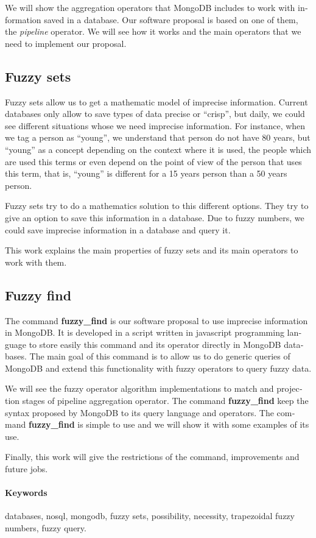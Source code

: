 \begin{otherlanguage}{american}
We will show the aggregation operators that MongoDB includes to work with information saved in a database. Our software proposal is based on one of them, the \textit{pipeline} operator. We will see how it works and the main operators that we need to implement our proposal.

\subsection{Fuzzy sets}

Fuzzy sets allow us to get a mathematic model of imprecise information. Current databases only allow to save types of data precise or ``crisp'', but daily, we could see different situations whose we need imprecise information. For instance, when we tag a person as ``young'', we understand that person do not have 80 years, but ``young'' as a concept depending on the context where it is used, the people which are used this terms or even depend on the point of view of the person that uses this term, that is, ``young'' is different for a 15 years person than a 50 years person.

Fuzzy sets try to do a mathematics solution to this different options. They try to give an option to save this information in a database. Due to fuzzy numbers, we could save imprecise information in a database and query it.

This work explains the main properties of fuzzy sets and its main operators to work with them.

\subsection{Fuzzy find}

The command \textbf{fuzzy\_find} is our software proposal to use imprecise information in MongoDB. It is developed in a script written in javascript programming language to store easily this command and its operator directly in MongoDB databases. The main goal of this command is to allow us to do generic queries of MongoDB and extend this functionality with fuzzy operators to query fuzzy data.

We will see the fuzzy operator algorithm implementations to match and projection stages of pipeline aggregation operator. The command \textbf{fuzzy\_find} keep the syntax proposed by MongoDB to its query language and operators. The command \textbf{fuzzy\_find} is simple to use and we will show it with some examples of its use.

Finally, this work will give the restrictions of the command, improvements and future jobs.


\paragraph{Keywords} databases, nosql, mongodb, fuzzy sets, possibility, necessity, trapezoidal fuzzy numbers, fuzzy query.


\end{otherlanguage}

\newpage
